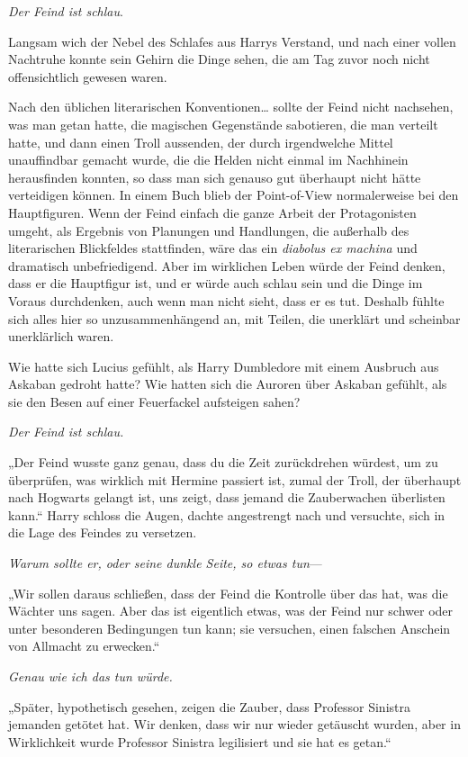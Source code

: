 {\emph{Der Feind ist schlau}.

Langsam wich der Nebel des Schlafes aus Harrys Verstand, und nach einer vollen Nachtruhe konnte sein Gehirn die Dinge sehen, die am Tag zuvor noch nicht offensichtlich gewesen waren.

Nach den üblichen literarischen Konventionen… sollte der Feind nicht nachsehen, was man getan hatte, die magischen Gegenstände sabotieren, die man verteilt hatte, und dann einen Troll aussenden, der durch irgendwelche Mittel unauffindbar gemacht wurde, die die Helden nicht einmal im Nachhinein herausfinden konnten, so dass man sich genauso gut überhaupt nicht hätte verteidigen können. In einem Buch blieb der Point-of-View normalerweise bei den Hauptfiguren. Wenn der Feind einfach die ganze Arbeit der Protagonisten umgeht, als Ergebnis von Planungen und Handlungen, die außerhalb des literarischen Blickfeldes stattfinden, wäre das ein \emph{diabolus ex machina} und dramatisch unbefriedigend. Aber im wirklichen Leben würde der Feind denken, dass er die Hauptfigur ist, und er würde auch schlau sein und die Dinge im Voraus durchdenken, auch wenn man nicht sieht, dass er es tut. Deshalb fühlte sich alles hier so unzusammenhängend an, mit Teilen, die unerklärt und scheinbar unerklärlich waren.

Wie hatte sich Lucius gefühlt, als Harry Dumbledore mit einem Ausbruch aus Askaban gedroht hatte? Wie hatten sich die Auroren über Askaban gefühlt, als sie den Besen auf einer Feuerfackel aufsteigen sahen?

\emph{Der Feind ist schlau.}

„Der Feind wusste ganz genau, dass du die Zeit zurückdrehen würdest, um zu überprüfen, was wirklich mit Hermine passiert ist, zumal der Troll, der überhaupt nach Hogwarts gelangt ist, uns zeigt, dass jemand die Zauberwachen überlisten kann.“ Harry schloss die Augen, dachte angestrengt nach und versuchte, sich in die Lage des Feindes zu versetzen.

\emph{Warum sollte er, oder seine dunkle Seite, so etwas tun}—

„Wir sollen daraus schließen, dass der Feind die Kontrolle über das hat, was die Wächter uns sagen. Aber das ist eigentlich etwas, was der Feind nur schwer oder unter besonderen Bedingungen tun kann; sie versuchen, einen falschen Anschein von Allmacht zu erwecken.“

\emph{Genau wie ich das tun würde.}

„Später, hypothetisch gesehen, zeigen die Zauber, dass Professor Sinistra jemanden getötet hat. Wir denken, dass wir nur wieder getäuscht wurden, aber in Wirklichkeit wurde Professor Sinistra legilisiert und sie hat es getan.“

}

